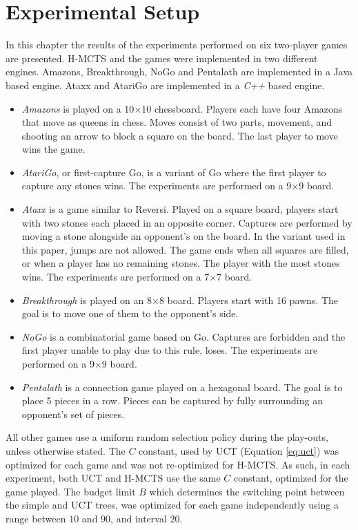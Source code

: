 \documentclass{kecsmstr}
\begin{document}
\section{Experimental Setup}
\label{sec:ex_setup}
In this chapter the results of the experiments performed on six two-player games are presented. H-MCTS and the games were implemented in two different engines. Amazons, Breakthrough, NoGo and Pentalath are implemented in a Java based engine. Ataxx and AtariGo are implemented in a \emph{C++} based engine.
\begin{itemize}
\item \emph{Amazons} is played on a 10$\times$10 chessboard. Players each have four Amazons that move as queens in chess. Moves consist of two parts, movement, and shooting an arrow to block a square on the board. The last player to move wins the game.
\item \emph{AtariGo}, or first-capture Go, is a variant of Go where the first player to capture any stones wins. The experiments are performed on a 9$\times$9 board.
\item \emph{Ataxx} is a game similar to Reversi. Played on a square board, players start with two stones each placed in an opposite corner. Captures are performed by moving a stone alongside an opponent's on the board. In the variant used in this paper, jumps are not allowed. The game ends when all squares are filled, or when a player has no remaining stones. The player with the most stones wins.  The experiments are performed on a 7$\times$7 board.
\item \emph{Breakthrough} is played on an 8$\times$8 board. Players start with 16 pawns. The goal is to move one of them to the opponent's side.
\item \emph{NoGo} is a combinatorial game based on Go. Captures are forbidden and the first player unable to play due to this rule, loses. The experiments are performed on a 9$\times$9 board.
\item \emph{Pentalath} is a connection game played on a hexagonal board. The goal is to place 5 pieces in a row. Pieces can be captured by fully surrounding an opponent's set of pieces.
\end{itemize}

All other games use a uniform random selection policy during the play-outs, unless otherwise stated. The $C$ constant, used by UCT (Equation \ref{eq:uct}) was optimized for each game and was not re-optimized for H-MCTS. As such, in each experiment, both UCT and H-MCTS use the same $C$ constant, optimized for the game played. The budget limit $B$ which determines the switching point between the simple and UCT trees, was optimized for each game independently using a range between $10$ and $90$, and interval $20$.
\end{document}
